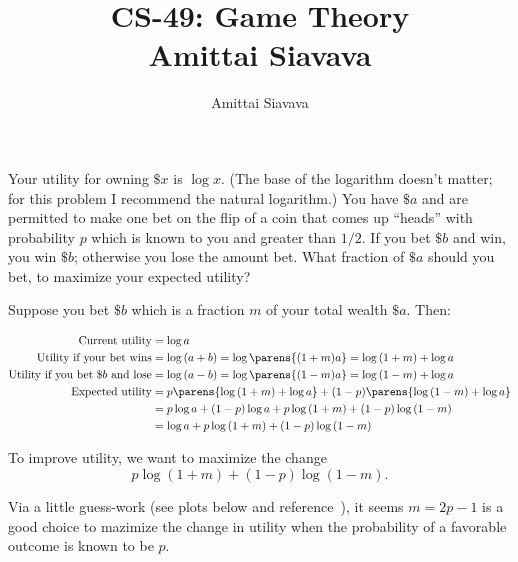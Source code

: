 \documentclass[13pt, reqno]{amsart}
\begin{document}

\title{CS-49: Game Theory\\ Amittai Siavava \\ }
\author{Amittai Siavava}


\setlength{\headheight}{13.0pt}
\setlength{\footskip}{15.0pt}

\maketitle

\begin{problem}[3]
  Your utility for owning $\$x$ is $\log{x}$.
  (The base of the logarithm doesn't matter; for this problem I recommend the natural logarithm.)
  You have $\$a$ and are permitted to make one bet on the flip of a coin that comes up ``heads''
  with probability $p$ which is known to you and greater than $1/2$.
  If you bet $\$b$ and win, you win $\$b$; otherwise you lose the amount bet.
  What fraction of $\$a$ should you bet, to maximize your expected utility?

  Suppose you bet $\$b$ which is a fraction $m$ of your total wealth $\$a$.
  Then:
  
  \begin{align*}
    \text{Current utility} &= \log{a} \\
    \text{Utility if your bet wins} &= \log{(a + b)} = \log{\parens{(1 + m)a}} = \log{(1 + m)} + \log{a} \\
    \text{Utility if you bet $\$b$ and lose} &= \log{(a - b)} = \log{\parens{(1 - m)a}} = \log{(1 - m)} + \log{a} \\
    \text{Expected utility} &= p \parens{\log{(1 + m)} + \log{a}} + (1 - p)\parens{\log{(1 - m)} + \log{a}} \\
                            &= p \log{a} + (1 - p) \log{a} + p \log{(1 + m)} + (1 - p) \log{(1 - m)} \\
                            &= \log{a} + p \log{(1 + m)} + (1 - p) \log{(1 - m)} \\
  \end{align*}
  
  To improve utility, we want to maximize the change
  \[ p \log{(1 + m)} + (1 - p) \log{(1 - m)}. \]

  Via a little guess-work (see plots below and reference~\cite{github-repo}), it seems $m = 2p - 1$ is a good choice
  to mazimize the change in utility when the probability of a favorable outcome
  is known to be $p$.
  \begin{figure}[H]


\end{figure}
\end{problem}
\end{document}
